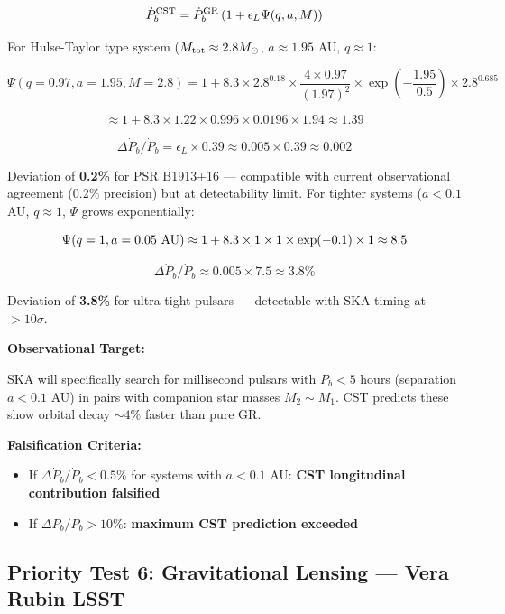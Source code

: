 \documentclass[10pt,a4paper]{article}
\providecommand{\tightlist}{\setlength{\itemsep}{0pt}\setlength{\parskip}{0pt}}
\begin{document}
\[\dot P_b^{\rm CST} = \dot P_b^{\rm GR} \left(1 + \epsilon_L \Psi(q, a, M)\right)\]

For Hulse-Taylor type system (\(M_{\rm tot} \approx 2.8 M_\odot\),
\(a \approx 1.95\) AU, \(q \approx 1\):

\[\Psi(q=0.97, a=1.95, M=2.8) = 1 + 8.3 \times 2.8^{0.18} \times \frac{4\times0.97}{(1.97)^2} \times \exp\left(-\frac{1.95}{0.5}\right) \times 2.8^{0.685}\]

\[\approx 1 + 8.3 \times 1.22 \times 0.996 \times 0.0196 \times 1.94 \approx 1.39\]

\[\Delta\dot P_b/\dot P_b = \epsilon_L \times 0.39 \approx 0.005 \times 0.39 \approx 0.002\]

Deviation of \textbf{0.2\%} for PSR B1913+16 --- compatible with current
observational agreement (0.2\% precision) but at detectability limit.
For tighter systems (\(a < 0.1\) AU, \(q \approx 1\), \(\Psi\) grows
exponentially:

\[\Psi(q=1, a=0.05~{\rm AU}) \approx 1 + 8.3 \times 1 \times 1 \times \exp(-0.1) \times 1 \approx 8.5\]

\[\Delta\dot P_b/\dot P_b \approx 0.005 \times 7.5 \approx 3.8\%\]

Deviation of \textbf{3.8\%} for ultra-tight pulsars --- detectable with
SKA timing at \(> 10\sigma\).

\textbf{Observational Target:}

SKA will specifically search for millisecond pulsars with \(P_b < 5\)
hours (separation \(a < 0.1\) AU) in pairs with companion star masses
\(M_2 \sim M_1\). CST predicts these show orbital decay \(\sim 4\%\)
faster than pure GR.

\textbf{Falsification Criteria:}

\begin{itemize}
\tightlist
\item
  If \(\Delta\dot P_b/\dot P_b < 0.5\%\) for systems with \(a < 0.1\)
  AU: \textbf{CST longitudinal contribution falsified}
\item
  If \(\Delta\dot P_b/\dot P_b > 10\%\): \textbf{maximum CST prediction
  exceeded}
\end{itemize}

\subsection{Priority Test 6: Gravitational Lensing --- Vera Rubin
LSST}\label{priority-test-6-gravitational-lensing-vera-rubin-lsst}
\end{document}
